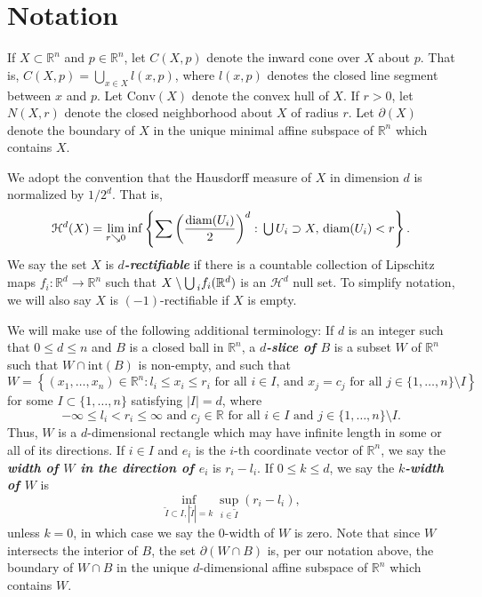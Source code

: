 \documentclass[10pt]{amsart}
\theoremstyle{definition}
\theoremstyle{definition}
\theoremstyle{definition}
\theoremstyle{definition}
\theoremstyle{definition}
\theoremstyle{definition}
\theoremstyle{definition}
\newcommand{\R}{\ensuremath{\mathbb{R}}}
\newcommand{\<}{\langle}
\renewcommand{\>}{\rangle}
\newcommand*{\medcup}{\mathbin{\scalebox{1}{\ensuremath{\bigcup\,}}}}%
\def\i{\infty}
\def\co{\textrm{Conv}}
\def\fr{\partial}
\def\H{\mathcal{H}}
\def\downto{\searrow}
\begin{document}
\section{Notation}
If \( X\subset \R^n \) and \( p\in \R^n \), let \( C(X,p) \) denote the inward cone over \( X \) about \( p \). That is, \( C(X,p) = \bigcup_{x\in X} l(x,p) \), where \( l(x,p) \) denotes the closed line segment between \( x \) and \( p \). Let \( \co(X) \) denote the convex hull of \( X \). If \( r>0 \), let \( N(X,r) \) denote the closed neighborhood about \( X \) of radius \( r \). Let \( \fr(X) \) denote the boundary of \( X \) in the unique minimal affine subspace of \( \R^n \) which contains \( X \).

We adopt the convention that the Hausdorff measure of \( X \) in dimension \( d \) is normalized by \( 1/2^d \). That is, \[ \H^d(X)=\lim_{r\downto 0}\inf \left\{ \sum \left(\frac{\textrm{diam}(U_i)}{2}\right)^d :\, \medcup U_i\supset X,\, \textrm{diam}(U_i)< r \right\}. \] We say the set \( X \) is \emph{\textbf{\( d \)-rectifiable}} if there is a countable collection of Lipschitz maps \( f_i:\R^d\to \R^n \) such that \( X\setminus \medcup_i f_i(\R^d) \) is an \( \H^d \) null set. To simplify notation, we will also say \( X \) is \( (-1) \)-rectifiable if \( X \) is empty.

We will make use of the following additional terminology: If \( d \) is an integer such that \( 0\leq d\leq n \) and \( B \) is a closed ball in \( \R^n \), a \emph{\textbf{\( d \)-slice of \( B \)}} is a subset \( W \) of \( \R^n \) such that \( W\cap \textrm{int} (B) \) is non-empty, and such that \[ W= \left\{(x_1,\dots,x_n)\in \R^n: l_i\leq x_i\leq r_i \textrm{ for all } i\in I \textrm{, and } x_j=c_j \textrm{ for all } j\in \{1,\dots,n\}\setminus I \right\} \] for some \( I\subset \{1,\dots,n\} \) satisfying \( |I|=d \), where \[ -\i\leq l_i<r_i\leq\i \textrm{ and } c_j\in \R \textrm{ for all } i\in I \textrm{ and } j\in \{1,\dots,n\}\setminus I. \] Thus, \( W \) is a \( d \)-dimensional rectangle which may have infinite length in some or all of its directions. If \( i\in I \) and \( e_i \) is the \( i \)-th coordinate vector of \( \R^n \), we say the \emph{\textbf{width of \( W \) in the direction of \( e_i \)}} is \( r_i-l_i \). If \( 0\leq k\leq d \), we say the \emph{\textbf{\( k \)-width of \( W \)}} is \[ \inf_{\tilde{I}\subset I, |\tilde{I}|=k} \sup_{i\in \tilde{I}} (r_i-l_i), \] unless \( k=0 \), in which case we say the \( 0 \)-width of \( W \) is zero. Note that since \( W \) intersects the interior of \( B \), the set \( \fr(W\cap B) \) is, per our notation above, the boundary of \( W\cap B \) in the unique \( d \)-dimensional affine subspace of \( \R^n \) which contains \( W \).
\end{document}
